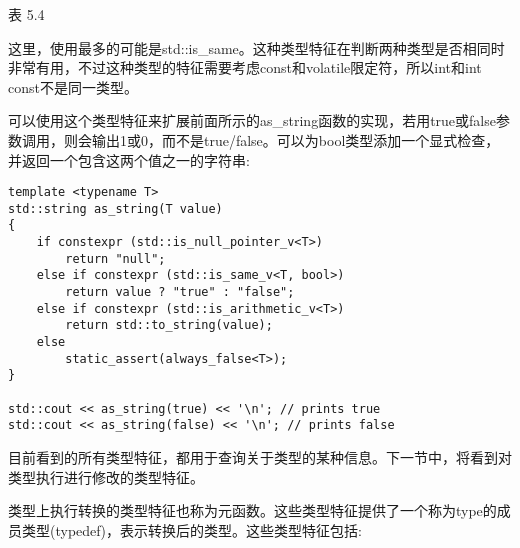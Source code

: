\begin{center}
表 5.4
\end{center}

这里，使用最多的可能是std::is\_same。这种类型特征在判断两种类型是否相同时非常有用，不过这种类型的特征需要考虑const和volatile限定符，所以int和int const不是同一类型。

可以使用这个类型特征来扩展前面所示的as\_string函数的实现，若用true或false参数调用，则会输出1或0，而不是true/false。可以为bool类型添加一个显式检查，并返回一个包含这两个值之一的字符串:

\begin{lstlisting}[style=styleCXX]
template <typename T>
std::string as_string(T value)
{
	if constexpr (std::is_null_pointer_v<T>)
		return "null";
	else if constexpr (std::is_same_v<T, bool>)
		return value ? "true" : "false";
	else if constexpr (std::is_arithmetic_v<T>)
		return std::to_string(value);
	else
		static_assert(always_false<T>);
}

std::cout << as_string(true) << '\n'; // prints true
std::cout << as_string(false) << '\n'; // prints false
\end{lstlisting}

目前看到的所有类型特征，都用于查询关于类型的某种信息。下一节中，将看到对类型执行进行修改的类型特征。


类型上执行转换的类型特征也称为元函数。这些类型特征提供了一个称为type的成员类型(typedef)，表示转换后的类型。这些类型特征包括:

